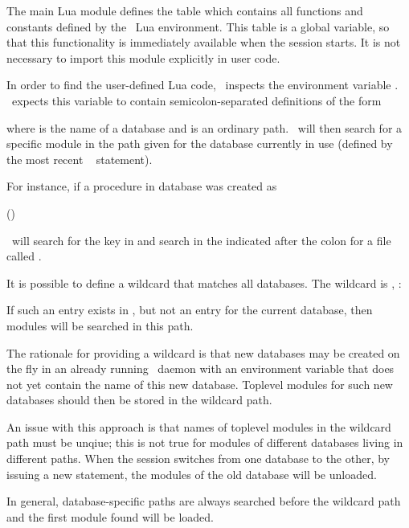 The main Lua module defines the table 
 which contains all
functions and constants defined by
the \nowdb\ Lua environment.
This table is a global variable,
so that this functionality is immediately available
when the session starts.
It is not necessary to import this module explicitly
in user code.

In order to find the user-defined Lua code,
\nowdb\ inspects the environment variable
. \nowdb\ expects
this variable to contain
semicolon-separated definitions of the form


where  is the name of a database and
 is an ordinary  path.
\nowdb\ will then search for a specific module
in the path given for the database currently
in use (defined by the most recent
\sql\  statement).

For instance, if a procedure in database 
was created as

 ()
 

\nowdb\ will search for the key  in
 and search in the 
indicated after the colon for a file called
.

It is possible to define a wildcard that matches all databases.
The wildcard is \tech{*}, \eg:


If such an entry exists 
in ,
but not an entry for the current database,
then modules will be searched in this path.

The rationale for providing a wildcard is that
new databases may be created on the fly in an already
running \nowdb\ daemon with an environment variable
that does not yet contain the name of this new database.
Toplevel modules for such new databases
should then be stored in the wildcard path.

An issue with this approach is that names
of toplevel modules in the wildcard path must be unqiue;
this is not true for modules of different
databases living in different paths.
When the session switches from one database to the other,
by issuing a new  statement,
the modules of the old database will be unloaded.

In general, database-specific paths are always 
searched before the wildcard path
and the first module found will be
loaded.

